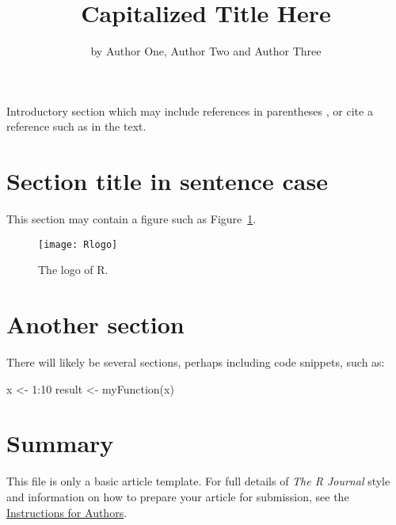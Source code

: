 \title{Capitalized Title Here}
\author{by Author One, Author Two and Author Three}

\maketitle


Introductory section which may include references in parentheses
\citep{R}, or cite a reference such as \citet{R} in the text.

\section{Section title in sentence case}

This section may contain a figure such as Figure~\ref{figure:rlogo}.

\begin{figure}[htbp]
  \centering
  \texttt{[image: Rlogo]}
  \label{figure:rlogo}
  \caption{The logo of R.}
\end{figure}

\section{Another section}

There will likely be several sections, perhaps including code snippets, such as:

\begin{example}
  x <- 1:10
  result <- myFunction(x)
\end{example}

\section{Summary}

This file is only a basic article template. For full details of \emph{The R Journal} style and information on how to prepare your article for submission, see the \href{http://journal.r-project.org/latex/RJauthorguide.pdf}{Instructions for Authors}.



\address{Author One\\
  Affiliation\\
  Address\\
  Country}

\address{Author Two\\
  Affiliation\\
  Address\\
  Country}

\address{Author Three\\
  Affiliation\\
  Address\\
  Country}
